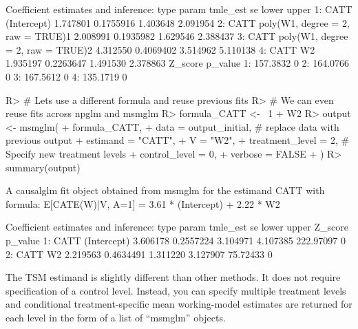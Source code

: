 \documentclass[
]{jss}
\begin{document}
\begin{CodeChunk}
\begin{CodeOutput}
Coefficient estimates and inference:
   type                             param tmle_est        se    lower    upper
1: CATT                       (Intercept) 1.747801 0.1755916 1.403648 2.091954
2: CATT poly(W1, degree = 2, raw = TRUE)1 2.008991 0.1935982 1.629546 2.388437
3: CATT poly(W1, degree = 2, raw = TRUE)2 4.312550 0.4069402 3.514962 5.110138
4: CATT                                W2 1.935197 0.2263647 1.491530 2.378863
    Z_score p_value
1: 157.3832       0
2: 164.0766       0
3: 167.5612       0
4: 135.1719       0
\end{CodeOutput}
\begin{CodeInput}
R> # Lets use a different formula and reuse previous fits
R> # We can even reuse fits across npglm and msmglm
R> formula_CATT <- ~1 + W2  
R> output <- msmglm(
+       formula_CATT, 
+       data = output_initial, # replace data with previous output
+       estimand = "CATT", 
+       V = "W2",
+       treatment_level = 2,  # Specify new treatment levels
+       control_level = 0,
+       verbose = FALSE
+       )
R> summary(output)
\end{CodeInput}
\begin{CodeOutput}
A causalglm fit object obtained from msmglm for the estimand CATT with formula: 
E[CATE(W)|V, A=1] = 3.61 * (Intercept) + 2.22 * W2

Coefficient estimates and inference:
   type       param tmle_est        se    lower    upper   Z_score p_value
1: CATT (Intercept) 3.606178 0.2557224 3.104971 4.107385 222.97097       0
2: CATT          W2 2.219563 0.4634491 1.311220 3.127907  75.72433       0
\end{CodeOutput}
\end{CodeChunk}

The TSM estimand is slightly different than other methods. It does not
require specification of a control level. Instead, you can specify
multiple treatment levels and conditional treatment-specific mean
working-model estimates are returned for each level in the form of a
list of ``msmglm'' objects.
\end{document}
